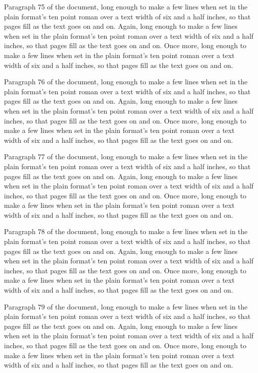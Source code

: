 Paragraph 75 of the document, long enough to make a few lines when set in the plain format's ten point roman over a text width of six and a half inches, so that pages fill as the text goes on and on. Again, long enough to make a few lines when set in the plain format's ten point roman over a text width of six and a half inches, so that pages fill as the text goes on and on. Once more, long enough to make a few lines when set in the plain format's ten point roman over a text width of six and a half inches, so that pages fill as the text goes on and on.

Paragraph 76 of the document, long enough to make a few lines when set in the plain format's ten point roman over a text width of six and a half inches, so that pages fill as the text goes on and on. Again, long enough to make a few lines when set in the plain format's ten point roman over a text width of six and a half inches, so that pages fill as the text goes on and on. Once more, long enough to make a few lines when set in the plain format's ten point roman over a text width of six and a half inches, so that pages fill as the text goes on and on.

Paragraph 77 of the document, long enough to make a few lines when set in the plain format's ten point roman over a text width of six and a half inches, so that pages fill as the text goes on and on. Again, long enough to make a few lines when set in the plain format's ten point roman over a text width of six and a half inches, so that pages fill as the text goes on and on. Once more, long enough to make a few lines when set in the plain format's ten point roman over a text width of six and a half inches, so that pages fill as the text goes on and on.

Paragraph 78 of the document, long enough to make a few lines when set in the plain format's ten point roman over a text width of six and a half inches, so that pages fill as the text goes on and on. Again, long enough to make a few lines when set in the plain format's ten point roman over a text width of six and a half inches, so that pages fill as the text goes on and on. Once more, long enough to make a few lines when set in the plain format's ten point roman over a text width of six and a half inches, so that pages fill as the text goes on and on.

Paragraph 79 of the document, long enough to make a few lines when set in the plain format's ten point roman over a text width of six and a half inches, so that pages fill as the text goes on and on. Again, long enough to make a few lines when set in the plain format's ten point roman over a text width of six and a half inches, so that pages fill as the text goes on and on. Once more, long enough to make a few lines when set in the plain format's ten point roman over a text width of six and a half inches, so that pages fill as the text goes on and on.

